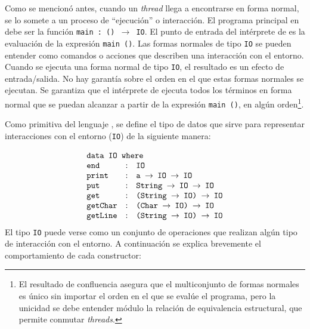 Como se mencionó antes, cuando un {\em thread} llega a encontrarse en forma normal,
se lo somete a un proceso de ``ejecución'' o interacción.
El programa principal en \nuflo debe ser la función \texttt{main : () $\to$ IO}.
El punto de entrada del intérprete de \nuflo es la evaluación de la expresión \texttt{main ()}.
Las formas normales de tipo \texttt{IO} se pueden entender como comandos o acciones
que describen una interacción con el entorno.
Cuando se ejecuta una forma normal de tipo \texttt{IO}, el resultado es un efecto de entrada/salida.
No hay garantía sobre el orden en el que estas formas normales se ejecutan.
Se garantiza que el intérprete de \nuflo ejecuta todos los términos en
forma normal que se puedan alcanzar a partir de la expresión \texttt{main ()}, en algún orden\footnote{El resultado
de confluencia asegura que el multiconjunto de formas normales es único sin importar el orden en
el que se evalúe el programa, pero la unicidad se debe entender módulo la relación
de equivalencia estructural, que permite conmutar {\em threads}.}.

Como primitiva del lenguaje \nuflo, se define el tipo de datos
que sirve para representar interacciones con el entorno (\texttt{IO})
de la siguiente manera:

$$
\begin{array}{l@{\hspace{-2.75cm}}llll}
  \texttt{data IO where} \\
                     &        & \texttt{end}     & : & \texttt{IO} \\
                     &        & \texttt{print}   & : & \texttt{a $\rightarrow$ IO $\rightarrow$ IO} \\
                     &        & \texttt{put}     & : & \texttt{String $\rightarrow$ IO $\rightarrow$ IO} \\
                     &        & \texttt{get}     & : & \texttt{(String $\rightarrow$ IO) $\rightarrow$ IO} \\
                     &        & \texttt{getChar} & : & \texttt{(Char $\rightarrow$ IO) $\rightarrow$ IO} \\
                     &        & \texttt{getLine} & : & \texttt{(String $\rightarrow$ IO) $\rightarrow$ IO} \\
\end{array}
$$
El tipo \texttt{IO} puede verse como un conjunto de operaciones que realizan
algún tipo de interacción con el entorno.
A continuación se explica brevemente el comportamiento de cada constructor:


